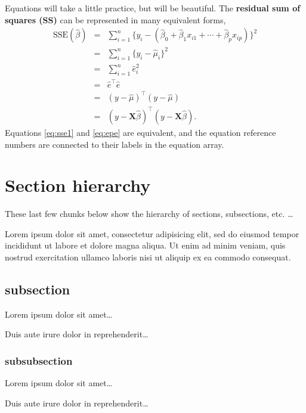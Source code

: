 \documentclass[letterpaper,12pt]{article}
\begin{document}
Equations will take a little practice, but will be beautiful.
The {\bf residual sum of squares (SS)} can be represented in many equivalent forms,
\begin{eqnarray}
\label{eq:sse1}
  \textrm{SSE}(\hat{\beta})
    & = &
  \sum_{i=1}^{n} \{ y_{i} - (\hat{\beta}_{0} + \hat{\beta}_{1} x_{i 1} + \cdots + \hat{\beta}_{p} x_{ip}) \}^2
\\ %
    & = &
  \sum_{i=1}^{n} \{ y_{i} - \hat{\mu}_{i} \}^2
\nonumber\\ %
    & = &
  \sum_{i=1}^{n} \hat{e}_{i}^2
\nonumber\\ %
\label{eq:epe}
    & = &
  \hat{e}^{\top} \hat{e}
\\ %
    & = &
  (y - \hat{\mu})^{\top} (y - \hat{\mu})
\nonumber\\ %
    & = &
  (y - \mathbf{X} \hat{\beta})^{\top} (y - \mathbf{X} \hat{\beta})
  .
\nonumber
\end{eqnarray}
Equations \eqref{eq:sse1} and \eqref{eq:epe} are equivalent, and the equation
  reference numbers are connected to their labels in the equation array.


\section{Section hierarchy}
These last few chunks below show the hierarchy of sections, subsections, etc. \ldots

Lorem ipsum dolor sit amet, consectetur adipisicing elit, sed do eiusmod tempor incididunt ut labore et dolore magna aliqua. Ut enim ad minim veniam, quis nostrud exercitation ullamco laboris nisi ut aliquip ex ea commodo consequat.

\subsection{subsection}
Lorem ipsum dolor sit amet\ldots

Duis aute irure dolor in reprehenderit\ldots

\subsubsection{subsubsection}
Lorem ipsum dolor sit amet\ldots

Duis aute irure dolor in reprehenderit\ldots
\end{document}
